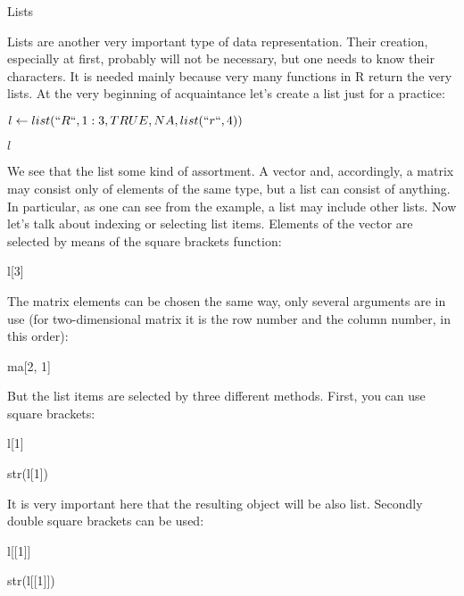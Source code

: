 \documentclass{beamer}
\begin{document}
\begin{frame}{Lists}

Lists are another very important type of data representation. Their creation, especially at first, probably will not be necessary, but one needs to know their characters. It is needed mainly because very many functions in R return the very lists. At the very beginning of acquaintance let’s create a list just for a practice:
\begin{center}

$l \leftarrow list(``R``, 1:3, TRUE, NA, list(``r``, 4))$

$l$
\end{center}
\end{frame}


\begin{frame}{}
We see that the list some kind of assortment. A vector and, accordingly, a matrix may consist only of elements of the same type, but a list can consist of anything. In particular, as one can see from the example, a list may include other lists. Now let's talk about indexing or selecting list items. Elements of the vector are selected by means of the square brackets function:
\begin{center}

l[3]

\end{center}
\end{frame}







\begin{frame}{}
The matrix elements can be chosen the same way, only several arguments are in use (for two-dimensional matrix it is the row number and the column number, in this order):
\begin{center}

ma[2, 1]

\end{center}
\end{frame}

\begin{frame}{}

But the list items are selected by three different methods. First, you can use square brackets:
\begin{center}

l[1]

str(l[1])
\end{center}

It is very important here that the resulting object will be also list. Secondly double square brackets can be used:

\begin{center}

l[[1]]

str(l[[1]])

\end{center}
\end{frame}
\end{document}
